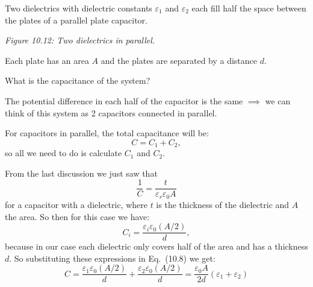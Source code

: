 \begin{example}
Two dielectrics with dielectric constants $\varepsilon_1$ and $\varepsilon_2$ each fill half the space between the plates of a parallel plate capacitor.

\vspace{0.5em}
\noindent
\begin{minipage}{0.45\textwidth}
\centering
{}
\par\smallskip\small\textit{Figure 10.12: Two dielectrics in parallel.}
\end{minipage}
\hfill
\begin{minipage}{0.51\textwidth}
Each plate has an area $A$ and the plates are separated by a distance $d$.

What is the capacitance of the system?

The potential difference in each half of the capacitor is the same $\implies$ we can think of this system as 2 capacitors connected in parallel.
\end{minipage}

\vspace{0.8em}
For capacitors in parallel, the total capacitance will be:
\begin{equation}
    C = C_1 + C_2,
\end{equation}
so all we need to do is calculate $C_1$ and $C_2$.

From the last discussion we just saw that
\[\frac{1}{C} = \frac{t}{\varepsilon_r \varepsilon_0 A}\]
for a capacitor with a dielectric, where $t$ is the thickness of the dielectric and $A$ the area. So then for this case we have:
\[C_i = \frac{\varepsilon_i \varepsilon_0 (A/2)}{d},\]
because in our case each dielectric only covers half of the area and has a thickness $d$. So substituting these expressions in Eq.~(10.8) we get:
\begin{equation*}
    \boxed{C = \frac{\varepsilon_1 \varepsilon_0 (A/2)}{d} + \frac{\varepsilon_2 \varepsilon_0 (A/2)}{d} = \frac{\varepsilon_0 A}{2d}(\varepsilon_1 + \varepsilon_2)}
\end{equation*}
\end{example}

